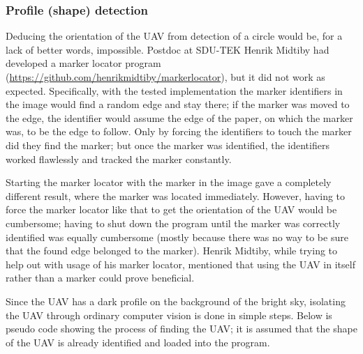 \subsubsection{Profile (shape) detection}
Deducing the orientation of the UAV from detection of a circle would be, for a lack of better words, impossible. Postdoc at SDU-TEK Henrik Midtiby had developed a marker locator program (\url{https://github.com/henrikmidtiby/markerlocator}), but it did not work as expected. Specifically, with the tested implementation the marker identifiers in the image would find a random edge and stay there; if the marker was moved to the edge, the identifier would assume the edge of the paper, on which the marker was, to be the edge to follow. Only by forcing the identifiers to touch the marker did they find the marker; but once the marker was identified, the identifiers worked flawlessly and tracked the marker constantly. 

Starting the marker locator with the marker in the image gave a completely different result, where the marker was located immediately. However, having to force the marker locator like that to get the orientation of the UAV would be cumbersome; having to shut down the program until the marker was correctly identified was equally cumbersome (mostly because there was no way to be sure that the found edge belonged to the marker). Henrik Midtiby, while trying to help out with usage of his marker locator, mentioned that using the UAV in itself rather than a marker could prove beneficial.

Since the UAV has a dark profile on the background of the bright sky, isolating the UAV through ordinary computer vision is done in simple steps. Below is pseudo code showing the process of finding the UAV; it is assumed that the shape of the UAV is already identified and loaded into the program.


